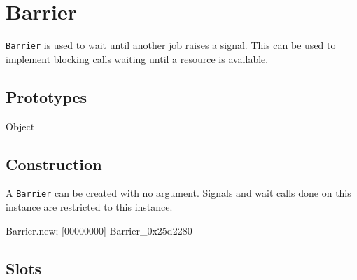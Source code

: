 \section{Barrier}

\lstinline|Barrier| is used to wait until another job raises a signal.
This can be used to implement blocking calls waiting until a resource
is available.

\subsection{Prototypes}

\begin{refObjects}
\item[Object]
\end{refObjects}

\subsection{Construction}

A \lstinline|Barrier| can be created with no argument.  Signals and wait
calls done on this instance are restricted to this instance.

\begin{urbiscript}[firstnumber=1]
Barrier.new;
[00000000] Barrier_0x25d2280
\end{urbiscript}

\subsection{Slots}

